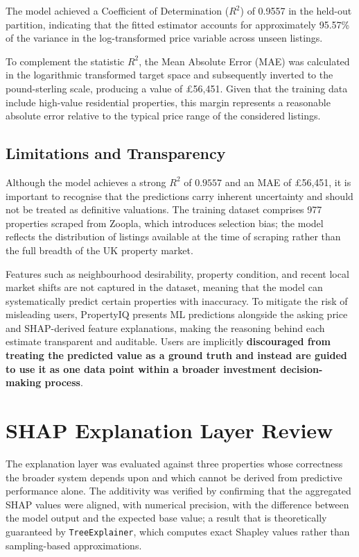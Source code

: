 The model achieved a Coefficient of Determination ($R^2$) of 0.9557 in the held-out partition, indicating that the fitted estimator accounts for approximately 95.57\% of the variance in the log-transformed price variable across unseen listings.

To complement the statistic $R^2$, the Mean Absolute Error (MAE) was calculated in the logarithmic transformed target space and subsequently inverted to the pound-sterling scale, producing a value of \pounds56,451. Given that the training data include high-value residential properties, this margin represents a reasonable absolute error relative to the typical price range of the considered listings.

\subsection{Limitations and Transparency}

Although the model achieves a strong $R^2$ of $0.9557$ and an MAE of \pounds56,451, it is important to recognise that the predictions carry inherent uncertainty and should not be treated as definitive valuations. The training dataset comprises 977 properties scraped from Zoopla, which introduces selection bias; the model reflects the distribution of listings available at the time of scraping rather than the full breadth of the UK property market. 

Features such as neighbourhood desirability, property condition, and recent local market shifts are not captured in the dataset, meaning that the model can systematically predict certain properties with inaccuracy. To mitigate the risk of misleading users, PropertyIQ presents ML predictions alongside the asking price and SHAP-derived feature explanations, making the reasoning behind each estimate transparent and auditable. Users are implicitly \textbf{discouraged from treating the predicted value as a ground truth and instead are guided to use it as one data point within a broader investment decision-making process}.


\section{SHAP Explanation Layer Review}

The explanation layer was evaluated against three properties whose correctness the broader system depends upon and which cannot be derived from predictive performance alone. The additivity was verified by confirming that the aggregated SHAP values were aligned, with numerical precision, with the difference between the model output and the expected base value; a result that is theoretically guaranteed by \verb|TreeExplainer|, which computes exact Shapley values rather than sampling-based approximations. 

